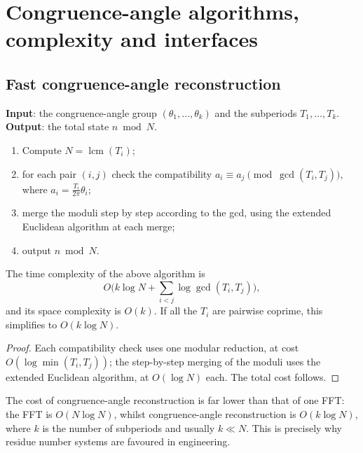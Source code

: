 \section{Congruence-angle algorithms, complexity and interfaces}\label{sec:congruence_angle_algorithms}

\subsection{Fast congruence-angle reconstruction}

\begin{definition}\label{def:congruence_angle_fast_reconstruction}
\textbf{Input}: the congruence-angle group $(\theta_1,\dots,\theta_k)$ and the subperiods $T_1,\dots,T_k$. \textbf{Output}: the total state $n\bmod N$.
\begin{enumerate}[label=\textbf{Step \arabic*.}]
    \item Compute $N=\operatorname{lcm}(T_i)$;
    \item for each pair $(i,j)$ check the compatibility $a_i\equiv a_j\pmod{\gcd(T_i,T_j)}$, where $a_i=\frac{T_i}{2\pi}\theta_i$;
    \item merge the moduli step by step according to the gcd, using the extended Euclidean algorithm at each merge;
    \item output $n\bmod N$.
\end{enumerate}
\end{definition}

\begin{theorem}[Complexity]\label{thm:congruence_angle_complexity}
The time complexity of the above algorithm is
\[
O\!\Big(k\log N+\sum_{i<j}\log\gcd(T_i,T_j)\Big),
\]
and its space complexity is $O(k)$. If all the $T_i$ are pairwise coprime, this simplifies to $O(k\log N)$.
\end{theorem}

\begin{proof}
Each compatibility check uses one modular reduction, at cost $O(\log\min(T_i,T_j))$; the step-by-step merging of the moduli uses the extended Euclidean algorithm, at $O(\log N)$ each. The total cost follows.
\end{proof}

\begin{remark}\label{rem:congruence_vs_fft}
The cost of congruence-angle reconstruction is far lower than that of one FFT: the FFT is $O(N\log N)$, whilst congruence-angle reconstruction is $O(k\log N)$, where $k$ is the number of subperiods and usually $k\ll N$. This is precisely why residue number systems are favoured in engineering.
\end{remark}

